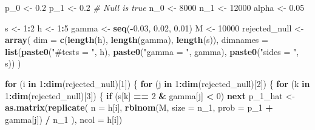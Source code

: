 \documentclass[
]{article}
\newenvironment{Shaded}{\begin{snugshade}}{\end{snugshade}}
\newcommand{\CommentTok}[1]{\textcolor[rgb]{0.56,0.35,0.01}{\textit{#1}}}
\newcommand{\ControlFlowTok}[1]{\textcolor[rgb]{0.13,0.29,0.53}{\textbf{#1}}}
\newcommand{\DataTypeTok}[1]{\textcolor[rgb]{0.13,0.29,0.53}{#1}}
\newcommand{\DecValTok}[1]{\textcolor[rgb]{0.00,0.00,0.81}{#1}}
\newcommand{\FloatTok}[1]{\textcolor[rgb]{0.00,0.00,0.81}{#1}}
\newcommand{\KeywordTok}[1]{\textcolor[rgb]{0.13,0.29,0.53}{\textbf{#1}}}
\newcommand{\NormalTok}[1]{#1}
\newcommand{\OperatorTok}[1]{\textcolor[rgb]{0.81,0.36,0.00}{\textbf{#1}}}
\newcommand{\StringTok}[1]{\textcolor[rgb]{0.31,0.60,0.02}{#1}}
\begin{document}
\begin{Shaded}
\begin{Highlighting}[]
{\NormalTok{p_}\DecValTok{0}\NormalTok{ <-}\StringTok{ }\FloatTok{0.2}
\NormalTok{p_}\DecValTok{1}\NormalTok{ <-}\StringTok{ }\FloatTok{0.2} \CommentTok{# Null is true}
\NormalTok{n_}\DecValTok{0}\NormalTok{ <-}\StringTok{ }\DecValTok{8000}
\NormalTok{n_}\DecValTok{1}\NormalTok{ <-}\StringTok{ }\DecValTok{12000}
\NormalTok{alpha <-}\StringTok{ }\FloatTok{0.05}

\NormalTok{s <-}\StringTok{ }\DecValTok{1}\OperatorTok{:}\DecValTok{2}
\NormalTok{h <-}\StringTok{ }\DecValTok{1}\OperatorTok{:}\DecValTok{5}
\NormalTok{gamma <-}\StringTok{ }\KeywordTok{seq}\NormalTok{(}\OperatorTok{-}\FloatTok{0.03}\NormalTok{, }\FloatTok{0.02}\NormalTok{, }\FloatTok{0.01}\NormalTok{)}
\NormalTok{M <-}\StringTok{ }\DecValTok{10000}
\NormalTok{rejected_null <-}\StringTok{ }\KeywordTok{array}\NormalTok{(}
  \DataTypeTok{dim =} \KeywordTok{c}\NormalTok{(}\KeywordTok{length}\NormalTok{(h), }\KeywordTok{length}\NormalTok{(gamma), }\KeywordTok{length}\NormalTok{(s)),}
  \DataTypeTok{dimnames =} \KeywordTok{list}\NormalTok{(}\KeywordTok{paste0}\NormalTok{(}\StringTok{"#tests = "}\NormalTok{, h), }\KeywordTok{paste0}\NormalTok{(}\StringTok{"gamma = "}\NormalTok{, gamma), }\KeywordTok{paste0}\NormalTok{(}\StringTok{"sides = "}\NormalTok{, s))}
\NormalTok{)}

\ControlFlowTok{for}\NormalTok{ (i }\ControlFlowTok{in} \DecValTok{1}\OperatorTok{:}\KeywordTok{dim}\NormalTok{(rejected_null)[}\DecValTok{1}\NormalTok{]) \{}
  \ControlFlowTok{for}\NormalTok{ (j }\ControlFlowTok{in} \DecValTok{1}\OperatorTok{:}\KeywordTok{dim}\NormalTok{(rejected_null)[}\DecValTok{2}\NormalTok{]) \{}
    \ControlFlowTok{for}\NormalTok{ (k }\ControlFlowTok{in} \DecValTok{1}\OperatorTok{:}\KeywordTok{dim}\NormalTok{(rejected_null)[}\DecValTok{3}\NormalTok{]) \{}
      \ControlFlowTok{if}\NormalTok{ (s[k] }\OperatorTok{==}\StringTok{ }\DecValTok{2} \OperatorTok{&}\StringTok{ }\NormalTok{gamma[j] }\OperatorTok{<}\StringTok{ }\DecValTok{0}\NormalTok{) }\ControlFlowTok{next}
\NormalTok{      p_}\DecValTok{1}\NormalTok{_hat <-}\StringTok{ }\KeywordTok{as.matrix}\NormalTok{(}\KeywordTok{replicate}\NormalTok{(}
        \DataTypeTok{n =}\NormalTok{ h[i],}
        \KeywordTok{rbinom}\NormalTok{(M, }\DataTypeTok{size =}\NormalTok{ n_}\DecValTok{1}\NormalTok{, }\DataTypeTok{prob =}\NormalTok{ p_}\DecValTok{1} \OperatorTok{+}\StringTok{ }\NormalTok{gamma[j]) }\OperatorTok{/}\StringTok{ }\NormalTok{n_}\DecValTok{1}
\NormalTok{      ), }\DataTypeTok{ncol =}\NormalTok{ h[i])}

}
\end{Highlighting}
\end{Shaded}
\end{document}
